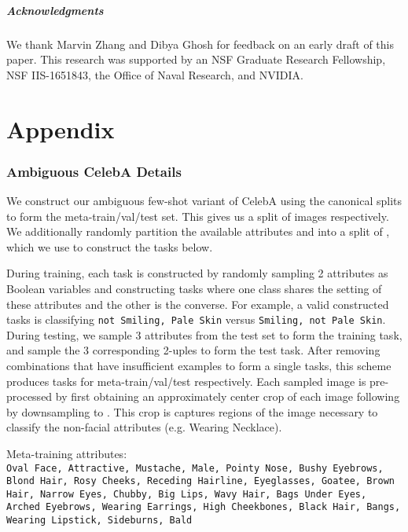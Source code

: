 \documentclass{article}
\begin{document}
 

\vspace{-0.1cm}
\subsubsection*{Acknowledgments}
\vspace{-0.1cm}
We thank Marvin Zhang and Dibya Ghosh for feedback on an early draft of this paper. This research was supported by an NSF Graduate Research Fellowship, NSF IIS-1651843, the Office of Naval Research, and NVIDIA.





\appendix
\newpage
\part*{Appendix}
\label{appendix}

\section{Ambiguous CelebA Details}

We construct our ambiguous few-shot variant of CelebA using the canonical splits to form the meta-train/val/test set. This gives us a split of  images respectively. We additionally randomly partition the  available attributes and into a split of , which we use to construct the tasks below.
 
During training, each task is constructed by randomly sampling 2 attributes as Boolean variables and constructing tasks where one class shares the setting of these attributes and the other is the converse. For example, a valid constructed tasks is classifying \texttt{not Smiling, Pale Skin} versus \texttt{Smiling, not Pale Skin}. During testing, we sample 3 attributes from the test set to form the training task, and sample the 3 corresponding 2-uples to form the test task. After removing combinations that have insufficient examples to form a single tasks, this scheme produces  tasks for meta-train/val/test respectively. Each sampled image is pre-processed by first obtaining an approximately  center crop of each image following by downsampling to . This crop is captures regions of the image necessary to classify the non-facial attributes (e.g. Wearing Necklace).

Meta-training attributes: \\
{ \small \texttt{Oval Face, Attractive, Mustache, Male, Pointy Nose, Bushy Eyebrows, Blond Hair, Rosy Cheeks, Receding Hairline, Eyeglasses, Goatee, Brown Hair, Narrow Eyes, Chubby, Big Lips, Wavy Hair, Bags Under Eyes, Arched Eyebrows, Wearing Earrings, High Cheekbones, Black Hair, Bangs, Wearing Lipstick, Sideburns, Bald}}
\end{document}
